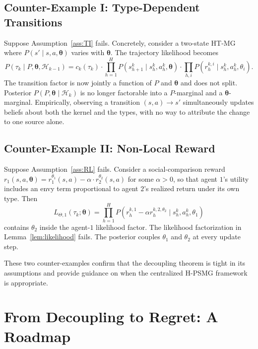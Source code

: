 \documentclass{article}
\begin{document}
\subsection{Counter-Example I: Type-Dependent Transitions}

Suppose Assumption~\ref{ass:TI} fails. Concretely, consider a two-state HT-MG where $P(s' \mid s, a, \boldsymbol{\theta})$ varies with $\boldsymbol{\theta}$. The trajectory likelihood becomes
\begin{equation}
P(\tau_k \mid P, \boldsymbol{\theta}, \mathcal{H}_{k-1}) = c_k(\tau_k) \cdot \prod_{h=1}^H P(s_{h+1}^k \mid s_h^k, a_h^k, \boldsymbol{\theta}) \cdot \prod_{h, i} P(r_h^{k,i} \mid s_h^k, a_h^k, \theta_i).
\end{equation}
The transition factor is now jointly a function of $P$ and $\boldsymbol{\theta}$ and does not split. Posterior $P(P, \boldsymbol{\theta} \mid \mathcal{H}_k)$ is no longer factorable into a $P$-marginal and a $\boldsymbol{\theta}$-marginal. Empirically, observing a transition $(s, a) \to s'$ simultaneously updates beliefs about both the kernel and the types, with no way to attribute the change to one source alone.

\subsection{Counter-Example II: Non-Local Reward}

Suppose Assumption~\ref{ass:RL} fails. Consider a social-comparison reward $r_1(s, a, \boldsymbol{\theta}) = r_1^{\theta_1}(s, a) - \alpha \cdot r_2^{\theta_2}(s, a)$ for some $\alpha > 0$, so that agent $1$'s utility includes an envy term proportional to agent $2$'s realized return under its own type. Then
\begin{equation}
L_{\Theta,1}(\tau_k; \boldsymbol{\theta}) = \prod_{h=1}^H P\left(r_h^{k,1} - \alpha r_h^{k,2,\theta_2} \mid s_h^k, a_h^k, \theta_1\right)
\end{equation}
contains $\theta_2$ inside the agent-$1$ likelihood factor. The likelihood factorization in Lemma~\ref{lem:likelihood} fails. The posterior couples $\theta_1$ and $\theta_2$ at every update step.

These two counter-examples confirm that the decoupling theorem is tight in its assumptions and provide guidance on when the centralized H-PSMG framework is appropriate.

\section{From Decoupling to Regret: A Roadmap}
\label{sec:regret-roadmap}
\end{document}
